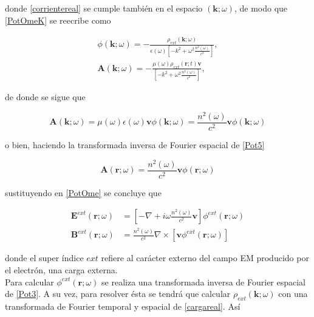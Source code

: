 \documentclass[a4paper,10pt]{article}
\begin{document}
donde \eqref{corrientereal} se cumple también en el espacio $(\textbf{k};\omega)$, de modo que \eqref{PotOmeK} se reecribe como

\begin{subequations}
\begin{align}
\phi(\textbf{k};\omega)=-\frac{\rho_{ext}(\textbf{k};\omega)}{\epsilon(\omega)\left[ -k^2+\omega^2\frac{n^2(\omega)}{c^2}\right] },	\label{Pot3}	\\
\textbf{A}(\textbf{k};\omega)=-\frac{\mu(\omega)\rho_{ext}(\textbf{r};t) \textbf{v}}{\left[ -k^2+\omega^2\frac{n^2(\omega)}{c^2}\right]},
\end{align}
\label{Pot2}
\end{subequations}

de donde se sigue que

\begin{equation}
\textbf{A}(\textbf{k};\omega)=\mu(\omega)\epsilon(\omega)\textbf{v}\phi(\textbf{k};\omega)=\frac{n^2(\omega)}{c^2}\textbf{v}\phi(\textbf{k};\omega)
\label{Pot5}
\end{equation}

o bien, haciendo la transformada inversa de Fourier espacial de \eqref{Pot5}

\begin{equation}
\textbf{A}(\textbf{r};\omega)=\frac{n^2(\omega)}{c^2}\textbf{v}\phi(\textbf{r};\omega)
\end{equation}

sustituyendo en \eqref{PotOme} se concluye que

\begin{subequations}
\begin{align}
\textbf{E}^{ext}(\textbf{r};\omega)&=\left[-\nabla+i\omega\frac{n^2(\omega)}{c^2}\textbf{v} \right] \phi^{ext}(\textbf{r};\omega)	\label{Eq2.17a}\\
\textbf{B}^{ext}(\textbf{r};\omega)&=\frac{n^2(\omega)}{c^2}\nabla\times[\textbf{v}\phi^{ext}(\textbf{r};\omega)]
\end{align}
\end{subequations}

donde el super índice $ext$ refiere al carácter externo del campo EM producido por el electrón, una carga externa. \\ 
Para calcular $\phi^{ext}(\textbf{r};\omega)$ se realiza una transformada inversa de Fourier espacial de \eqref{Pot3}. A su vez, para resolver ésta se tendrá que calcular $\rho_{ext}(\textbf{k};\omega)$ con una transformada de Fourier temporal y espacial de \eqref{cargareal}. Así
\end{document}
